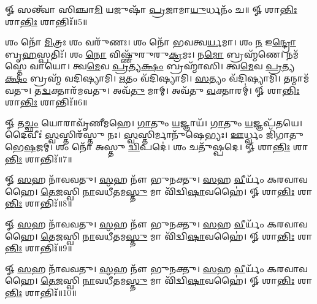 𑍐 𑌸𑌨𑍍𑌤𑍍𑌵𑌾᳴ 𑌸𑌿𑌞𑍍𑌚𑌾\-\ul{𑌮𑌿} 𑌯𑌜𑍁𑌷𑌾᳴ \ul{𑌪𑍍𑌰}\-𑌜𑌾𑌮𑌾\-\ul{𑌯𑍁}\-𑌰𑍍𑌧𑌨𑌂᳴ 𑌚॥ 𑍐 𑌶𑌾\-\ul{𑌨𑍍𑌤𑌿𑌃} 𑌶𑌾\-\ul{𑌨𑍍𑌤𑌿𑌃} 𑌶𑌾𑌨𑍍𑌤𑌿𑌃᳴॥5॥


𑌶𑌂 𑌨𑍋᳴ \ul{𑌮𑌿}\-𑌤𑍍𑌰𑌃  𑌶𑌂 𑌵𑌰𑍁᳴𑌣𑌃। 𑌶𑌂 𑌨𑍋᳴ 𑌭𑌵𑌤𑍍𑌵\-\ul{𑌰𑍍𑌯}\-𑌮𑌾। 𑌶𑌂 \ul{𑌨} 𑌇\-\ul{𑌨𑍍𑌦𑍍𑌰𑍋} 𑌬𑍃\-\ul{𑌹}\-𑌸𑍍𑌪𑌤𑌿𑌃᳴। 𑌶𑌂 \ul{𑌨𑍋} 𑌵𑌿𑌷𑍍𑌣𑍁᳴𑌰𑍁𑌰𑍁\-\ul{𑌕𑍍𑌰}\-𑌮𑌃। 𑌨\-\ul{𑌮𑍋} 𑌬𑍍𑌰𑌹𑍍𑌮᳴𑌣𑍇। 𑌨𑌮᳴𑌸𑍍𑌤𑍇 𑌵𑌾𑌯𑍋। 𑌤𑍍𑌵\-\ul{𑌮𑍇}\-𑌵 \ul{𑌪𑍍𑌰}\-𑌤𑍍𑌯\-\ul{𑌕𑍍𑌷𑌂} 𑌬𑍍𑌰𑌹𑍍𑌮𑌾᳴𑌸𑌿। 𑌤𑍍𑌵\-\ul{𑌮𑍇}\-𑌵 \ul{𑌪𑍍𑌰}\-𑌤𑍍𑌯\-\ul{𑌕𑍍𑌷𑌂} 𑌬𑍍𑌰𑌹𑍍𑌮᳴ 𑌵𑌦𑌿𑌷𑍍𑌯𑌾𑌮𑌿। \ul{𑌋}\-𑌤𑌂 𑌵᳴𑌦𑌿𑌷𑍍𑌯𑌾𑌮𑌿। \ul{𑌸}\-𑌤𑍍𑌯𑌂 𑌵᳴𑌦𑌿𑌷𑍍𑌯𑌾𑌮𑌿। 𑌤𑌨𑍍𑌮𑌾𑌮᳴𑌵𑌤𑍁। 𑌤\-\ul{𑌦𑍍𑌵}\-𑌕𑍍𑌤𑌾𑌰᳴𑌮𑌵𑌤𑍁। 𑌅𑌵᳴\-\ul{𑌤𑍁} 𑌮𑌾𑌮𑍍। 𑌅𑌵᳴𑌤𑍁 \ul{𑌵}\-𑌕𑍍𑌤𑌾𑌰𑌮𑍍॑। 𑍐 𑌶𑌾\-\ul{𑌨𑍍𑌤𑌿𑌃} 𑌶𑌾\-\ul{𑌨𑍍𑌤𑌿𑌃} 𑌶𑌾𑌨𑍍𑌤𑌿𑌃᳴॥6॥

𑍐 𑌤\-\ul{𑌚𑍍𑌛𑌂} 𑌯𑍋𑌰𑌾𑌵𑍃᳴𑌣𑍀𑌮𑌹𑍇। \ul{𑌗𑌾}\-𑌤𑍁𑌂 \ul{𑌯}\-𑌜𑍍𑌞𑌾𑌯᳴। \ul{𑌗𑌾}\-𑌤𑍁𑌂 \ul{𑌯}\-𑌜𑍍𑌞𑌪᳴𑌤𑌯𑍇। 
𑌦𑍈𑌵𑍀𑌃॑ \ul{𑌸𑍍𑌵}\-𑌸𑍍𑌤𑌿𑌰᳴𑌸𑍍𑌤𑍁 𑌨𑌃। \ul{𑌸𑍍𑌵}\-𑌸𑍍𑌤𑌿𑌰𑍍𑌮𑌾𑌨𑍁᳴𑌷𑍇𑌭𑍍𑌯𑌃। \ul{𑌊}\-𑌰𑍍𑌧𑍍𑌵𑌂 𑌜𑌿᳴𑌗𑌾𑌤𑍁 𑌭𑍇\-\ul{𑌷}\-𑌜𑌮𑍍। 
𑌶𑌂 𑌨𑍋᳴ 𑌅𑌸𑍍𑌤𑍁 \ul{𑌦𑍍𑌵𑌿}\-𑌪𑌦𑍇॑। 𑌶𑌂 𑌚𑌤𑍁᳴𑌷𑍍𑌪𑌦𑍇। 𑍐 𑌶𑌾\-\ul{𑌨𑍍𑌤𑌿𑌃} 𑌶𑌾\-\ul{𑌨𑍍𑌤𑌿𑌃} 𑌶𑌾𑌨𑍍𑌤𑌿𑌃᳴॥7॥

𑍐 \ul{𑌸}\-𑌹 𑌨𑌾᳴𑌵𑌵𑌤𑍁। \ul{𑌸}\-𑌹 𑌨𑍗᳴ 𑌭𑍁𑌨𑌕𑍍𑌤𑍁। \ul{𑌸}\-𑌹 \ul{𑌵𑍀}\-𑌰𑍍𑌯𑌂᳴ 𑌕𑌰𑌵𑌾𑌵𑌹𑍈। \ul{𑌤𑍇}\-\-\ul{𑌜}\-𑌸𑍍𑌵𑌿 \ul{𑌨𑌾}\-𑌵𑌧𑍀᳴𑌤𑌮\-\ul{𑌸𑍍𑌤𑍁} 𑌮𑌾 𑌵𑌿᳴𑌦𑍍𑌵𑌿\-\ul{𑌷𑌾}\-𑌵𑌹𑍈॑। 𑍐 𑌶𑌾\-\ul{𑌨𑍍𑌤𑌿𑌃} 𑌶𑌾\-\ul{𑌨𑍍𑌤𑌿𑌃} 𑌶𑌾𑌨𑍍𑌤𑌿𑌃᳴॥8॥

𑍐 \ul{𑌸}\-𑌹 𑌨𑌾᳴𑌵𑌵𑌤𑍁। \ul{𑌸}\-𑌹 𑌨𑍗᳴ 𑌭𑍁𑌨𑌕𑍍𑌤𑍁। \ul{𑌸}\-𑌹 \ul{𑌵𑍀}\-𑌰𑍍𑌯𑌂᳴ 𑌕𑌰𑌵𑌾𑌵𑌹𑍈। \ul{𑌤𑍇}\-\-\ul{𑌜}\-𑌸𑍍𑌵𑌿 \ul{𑌨𑌾}\-𑌵𑌧𑍀᳴𑌤𑌮\-\ul{𑌸𑍍𑌤𑍁} 𑌮𑌾 𑌵𑌿᳴𑌦𑍍𑌵𑌿\-\ul{𑌷𑌾}\-𑌵𑌹𑍈॑। 𑍐 𑌶𑌾\-\ul{𑌨𑍍𑌤𑌿𑌃} 𑌶𑌾\-\ul{𑌨𑍍𑌤𑌿𑌃} 𑌶𑌾𑌨𑍍𑌤𑌿𑌃᳴॥9॥

𑍐 \ul{𑌸}\-𑌹 𑌨𑌾᳴𑌵𑌵𑌤𑍁। \ul{𑌸}\-𑌹 𑌨𑍗᳴ 𑌭𑍁𑌨𑌕𑍍𑌤𑍁। \ul{𑌸}\-𑌹 \ul{𑌵𑍀}\-𑌰𑍍𑌯𑌂᳴ 𑌕𑌰𑌵𑌾𑌵𑌹𑍈। \ul{𑌤𑍇}\-\-\ul{𑌜}\-𑌸𑍍𑌵𑌿 \ul{𑌨𑌾}\-𑌵𑌧𑍀᳴𑌤𑌮\-\ul{𑌸𑍍𑌤𑍁} 𑌮𑌾 𑌵𑌿᳴𑌦𑍍𑌵𑌿\-\ul{𑌷𑌾}\-𑌵𑌹𑍈॑। 𑍐 𑌶𑌾\-\ul{𑌨𑍍𑌤𑌿𑌃} 𑌶𑌾\-\ul{𑌨𑍍𑌤𑌿𑌃} 𑌶𑌾𑌨𑍍𑌤𑌿𑌃᳴॥10॥
